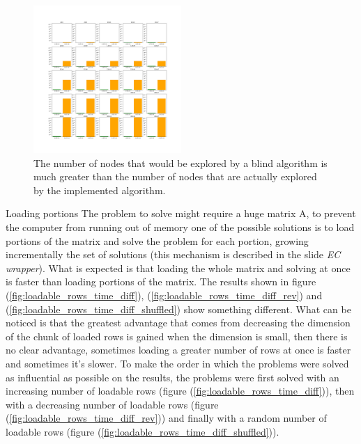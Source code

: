 \documentclass{beamer}
\begin{document}
\begin{frame}
    \begin{figure}
        \centering
        \includegraphics[width=0.5\textwidth]{explored_vs_explorable_5x5.pdf}
        \caption{The number of nodes that would be explored by a blind algorithm is
        much greater than the number of nodes that are actually explored by the implemented algorithm.}
        \label{fig:explored_vs_explorable_5x5}
    \end{figure}
\end{frame}

\begin{frame}{Loading portions}
    The problem to solve might require a huge matrix A,
    to prevent the computer from running out of memory
    one of the possible solutions is to load portions of the matrix
    and solve the problem for each portion, growing incrementally
    the set of solutions (this mechanism is described in the slide \textit{EC wrapper}).
    What is expected is that loading the whole matrix and solving
    at once is faster than loading portions of the matrix.
    The results shown in figure (\ref{fig:loadable_rows_time_diff}), 
    (\ref{fig:loadable_rows_time_diff_rev}) and (\ref{fig:loadable_rows_time_diff_shuffled})
    show something different.
    What can be noticed is that the greatest advantage that comes
    from decreasing the dimension of the chunk of loaded rows is gained
    when the dimension is small, then there is no clear advantage,
    sometimes loading a greater number of rows at once is faster
    and sometimes it's slower.
    To make the order in which the problems were solved as influential as possible 
    on the results, the problems were first solved with an increasing number of loadable rows (figure (\ref{fig:loadable_rows_time_diff})),
    then with a decreasing number of loadable rows (figure (\ref{fig:loadable_rows_time_diff_rev})) and finally with a random number of loadable rows
    (figure (\ref{fig:loadable_rows_time_diff_shuffled})).
\end{frame}
\end{document}
